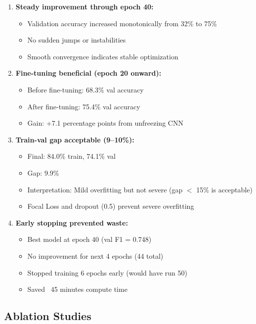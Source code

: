 \documentclass[11pt,a4paper]{article}
\begin{document}
\begin{enumerate}
\item \textbf{Steady improvement through epoch 40:}
   \begin{itemize}
   \item Validation accuracy increased monotonically from 32\% to 75\%
   \item No sudden jumps or instabilities
   \item Smooth convergence indicates stable optimization
   \end{itemize}

\item \textbf{Fine-tuning beneficial (epoch 20 onward):}
   \begin{itemize}
   \item Before fine-tuning: 68.3\% val accuracy
   \item After fine-tuning: 75.4\% val accuracy
   \item Gain: +7.1 percentage points from unfreezing CNN
   \end{itemize}

\item \textbf{Train-val gap acceptable (9--10\%):}
   \begin{itemize}
   \item Final: 84.0\% train, 74.1\% val
   \item Gap: 9.9\%
   \item Interpretation: Mild overfitting but not severe (gap $<$ 15\% is acceptable)
   \item Focal Loss and dropout (0.5) prevent severe overfitting
   \end{itemize}

\item \textbf{Early stopping prevented waste:}
   \begin{itemize}
   \item Best model at epoch 40 (val F1 = 0.748)
   \item No improvement for next 4 epochs (44 total)
   \item Stopped training 6 epochs early (would have run 50)
   \item Saved ~45 minutes compute time
   \end{itemize}
\end{enumerate}

\subsection{Ablation Studies}
\end{document}

